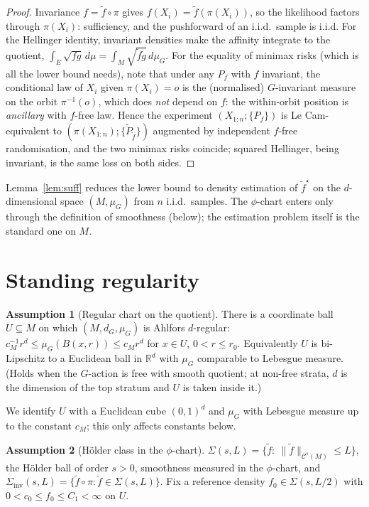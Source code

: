 \documentclass[11pt]{article}
\theoremstyle{plain}
\theoremstyle{definition}
\newtheorem{assumption}{Assumption}
\theoremstyle{remark}
\newcommand{\R}{\mathbb{R}}
\begin{document}
\begin{proof}
Invariance $f=\tilde f\circ\pi$ gives $f(X_i)=\tilde f(\pi(X_i))$, so the
likelihood factors through $\pi(X_i)$: sufficiency, and the pushforward of an
i.i.d.\ sample is i.i.d. For the Hellinger identity, invariant densities make the
affinity integrate to the quotient, $\int_E\sqrt{f g}\,d\mu=\int_M\sqrt{\tilde
f\tilde g}\,d\mu_G$. For the equality of minimax risks (which is all the lower
bound needs), note that under any $P_f$ with $f$ invariant, the conditional law of
$X_i$ given $\pi(X_i)=o$ is the (normalised) $G$-invariant measure on the orbit
$\pi^{-1}(o)$, which does \emph{not} depend on $f$: the within-orbit position is
\emph{ancillary} with $f$-free law. Hence the experiment $(X_{1:n};\{P_f\})$ is Le
Cam-equivalent to $(\pi(X_{1:n});\{\tilde P_{\tilde f}\})$ augmented by independent
$f$-free randomisation, and the two minimax risks coincide; squared Hellinger,
being invariant, is the same loss on both sides.
\end{proof}

Lemma~\ref{lem:suff} reduces the lower bound to density estimation of
$\tilde f^\star$ on the $d$-dimensional space $(M,\mu_G)$ from $n$ i.i.d.\ samples.
The $\phi$-chart enters only through the definition of smoothness (below); the
estimation problem itself is the standard one on $M$.

\section{Standing regularity}

\begin{assumption}[Regular chart on the quotient]\label{ass:reg}
There is a coordinate ball $U\subseteq M$ on which $(M,d_G,\mu_G)$ is Ahlfors
$d$-regular: $c_M^{-1}r^d\le \mu_G(B(x,r))\le c_M r^d$ for $x\in U$,
$0<r\le r_0$. Equivalently $U$ is bi-Lipschitz to a Euclidean ball in $\R^d$ with
$\mu_G$ comparable to Lebesgue measure. (Holds when the $G$-action is free with
smooth quotient; at non-free strata, $d$ is the dimension of the top stratum and
$U$ is taken inside it.)
\end{assumption}

We identify $U$ with a Euclidean cube $(0,1)^d$ and $\mu_G$ with Lebesgue measure
up to the constant $c_M$; this only affects constants below.

\begin{assumption}[H\"older class in the $\phi$-chart]\label{ass:holder}
$\Sigma(s,L)=\{\tilde f:\ \|\tilde f\|_{\mathcal C^s(M)}\le L\}$, the H\"older ball
of order $s>0$, smoothness measured in the $\phi$-chart, and
$\Sigma_{\mathrm{inv}}(s,L)=\{\tilde f\circ\pi:\tilde f\in\Sigma(s,L)\}$. Fix a
reference density $f_0\in\Sigma(s,L/2)$ with $0<c_0\le f_0\le C_1<\infty$ on $U$.
\end{assumption}
\end{document}
